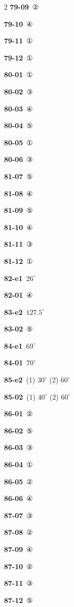 \documentclass[10pt,a4paper]{article}
\begin{document}
\begin{multicols}{2}
\noindent\textbf{79-09}\ ②\par
\noindent\textbf{79-10}\ ④\par
\noindent\textbf{79-11}\ ①\par
\noindent\textbf{79-12}\ ①\par
\noindent\textbf{80-01}\ ①\par
\noindent\textbf{80-02}\ ③\par
\noindent\textbf{80-03}\ ④\par
\noindent\textbf{80-04}\ ⑤\par
\noindent\textbf{80-05}\ ①\par
\noindent\textbf{80-06}\ ③\par
\noindent\textbf{81-07}\ ⑤\par
\noindent\textbf{81-08}\ ④\par
\noindent\textbf{81-09}\ ⑤\par
\noindent\textbf{81-10}\ ④\par
\noindent\textbf{81-11}\ ③\par
\noindent\textbf{81-12}\ ①\par
\noindent\textbf{82-e1}\ $26^\circ$\par
\noindent\textbf{82-01}\ ④\par
\noindent\textbf{83-e2}\ $127.5^\circ$\par
\noindent\textbf{83-02}\ ⑤\par
\noindent\textbf{84-e1}\ $69^\circ$\par
\noindent\textbf{84-01}\ $70^\circ$\par
\noindent\textbf{85-e2}\ (1) $30^\circ$ (2) $60^\circ$\par
\noindent\textbf{85-02}\ (1) $40^\circ$ (2) $60^\circ$\par
\noindent\textbf{86-01}\ ②\par
\noindent\textbf{86-02}\ ⑤\par
\noindent\textbf{86-03}\ ③\par
\noindent\textbf{86-04}\ ①\par
\noindent\textbf{86-05}\ ②\par
\noindent\textbf{86-06}\ ④\par
\noindent\textbf{87-07}\ ③\par
\noindent\textbf{87-08}\ ②\par
\noindent\textbf{87-09}\ ④\par
\noindent\textbf{87-10}\ ②\par
\noindent\textbf{87-11}\ ③\par
\noindent\textbf{87-12}\ ⑤\par

\end{multicols}
\end{document}
